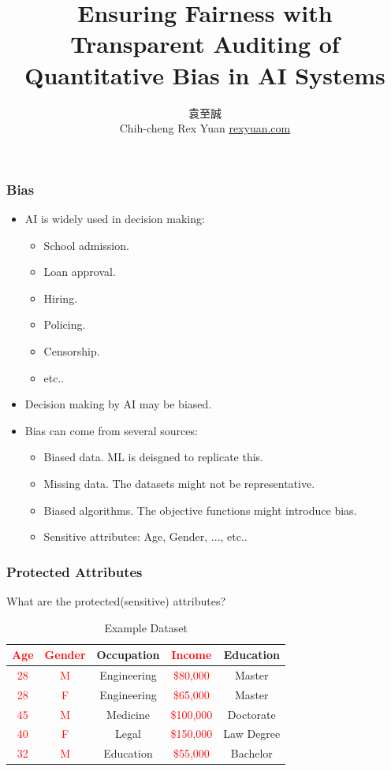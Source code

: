\documentclass{beamer}
\date{\displaydate{date}}
\title[Fairness]{Ensuring Fairness with Transparent Auditing of
Quantitative Bias in AI Systems}
\author[Rex]{
    \begin{CJK}{UTF8}{bsmi}袁至誠\end{CJK}\newline
    Chih-cheng Rex Yuan\newline
    \href{https://rexyuan.com/}{rexyuan.com}
    }
\institute[IIS,AS]{Institute of Information Science, Academia Sinica}
\newcommand{\red}[1]{\textcolor{red}{#1}}
\begin{document}
\begin{frame}
\titlepage
\end{frame}

\begin{frame}
    \frametitle{Bias}
    \begin{itemize}
        \item AI is widely used in decision making:
        \begin{itemize}
            \item School admission.
            \item Loan approval.
            \item Hiring.
            \item Policing.
            \item Censorship.
            \item etc..
        \end{itemize}
        \item Decision making by AI may be biased.
        \item Bias can come from several sources:
        \begin{itemize}
            \item Biased data. ML is deisgned to replicate this.
            \item Missing data. The datasets might not be representative.
            \item Biased algorithms. The objective functions might introduce bias.
            \item Sensitive attributes: Age, Gender, ..., etc..
        \end{itemize}
    \end{itemize}
\end{frame}

\begin{frame}
    \frametitle{Protected Attributes}
    What are the protected(sensitive) attributes?
    \begin{table}
        \begin{tabular}{|c|c|c|c|c|}
            \hline
            \red{Age} & \red{Gender} & Occupation & \red{Income} & Education \\
            \hline
            \red{28} & \red{M} & Engineering & \red{\$80,000} & Master \\
            \red{28} & \red{F} & Engineering & \red{\$65,000} & Master \\
            \red{45} & \red{M} & Medicine    & \red{\$100,000} & Doctorate \\
            \red{40} & \red{F} & Legal       & \red{\$150,000} & Law Degree \\
            \red{32} & \red{M} & Education   & \red{\$55,000} & Bachelor \\
            \hline
        \end{tabular}
        \caption{Example Dataset}
    \end{table}
\end{frame}
\end{document}
